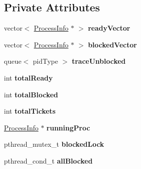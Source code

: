\subsection*{\-Private \-Attributes}
\begin{DoxyCompactItemize}
\item 
\hypertarget{classcLottery_a930e7485c542c8fad39340a6c76b81b4}{vector$<$ \hyperlink{structProcessInfo}{\-Process\-Info} $\ast$ $>$ {\bfseries ready\-Vector}}\label{dd/dc8/classcLottery_a930e7485c542c8fad39340a6c76b81b4}

\item 
\hypertarget{classcLottery_a58409db56629d3aa331c17478f9d3dc0}{vector$<$ \hyperlink{structProcessInfo}{\-Process\-Info} $\ast$ $>$ {\bfseries blocked\-Vector}}\label{dd/dc8/classcLottery_a58409db56629d3aa331c17478f9d3dc0}

\item 
\hypertarget{classcLottery_ac2148d920257e2d01a0760830986925e}{queue$<$ pid\-Type $>$ {\bfseries trace\-Unblocked}}\label{dd/dc8/classcLottery_ac2148d920257e2d01a0760830986925e}

\item 
\hypertarget{classcLottery_a05b33ad3e505d884e6e06b9a4a248306}{int {\bfseries total\-Ready}}\label{dd/dc8/classcLottery_a05b33ad3e505d884e6e06b9a4a248306}

\item 
\hypertarget{classcLottery_a13d6714808cc0a89b74773f1c3070ee7}{int {\bfseries total\-Blocked}}\label{dd/dc8/classcLottery_a13d6714808cc0a89b74773f1c3070ee7}

\item 
\hypertarget{classcLottery_a30adf681c7dd74aa73d8af349db0bc55}{int {\bfseries total\-Tickets}}\label{dd/dc8/classcLottery_a30adf681c7dd74aa73d8af349db0bc55}

\item 
\hypertarget{classcLottery_aca8eb62eb83b54b0fccd68350a90d57c}{\hyperlink{structProcessInfo}{\-Process\-Info} $\ast$ {\bfseries running\-Proc}}\label{dd/dc8/classcLottery_aca8eb62eb83b54b0fccd68350a90d57c}

\item 
\hypertarget{classcLottery_a789086be59ccc718e10575c9b0d57ce6}{pthread\-\_\-mutex\-\_\-t {\bfseries blocked\-Lock}}\label{dd/dc8/classcLottery_a789086be59ccc718e10575c9b0d57ce6}

\item 
\hypertarget{classcLottery_a1af5754b5f4b4dd73c2052d14fb704d8}{pthread\-\_\-cond\-\_\-t {\bfseries all\-Blocked}}\label{dd/dc8/classcLottery_a1af5754b5f4b4dd73c2052d14fb704d8}


\end{DoxyCompactItemize}
